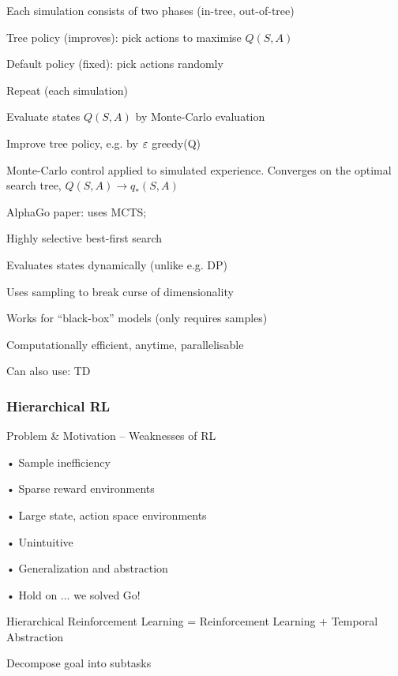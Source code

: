 \documentclass[english]{article}
\begin{document}
Each simulation consists of two phases (in-tree, out-of-tree)
\benum 
\item 
Tree policy (improves): pick actions to maximise $Q(S,A)$
\item 
Default policy (fixed): pick actions randomly
\eenum 
\item 
Repeat (each simulation)
\benum 
\item 
Evaluate states $Q(S,A)$ by Monte-Carlo evaluation
\item 
Improve tree policy, e.g. by $\varepsilon$ greedy(Q)
\eenum 
\item 

Monte-Carlo control applied to simulated experience. Converges on the optimal search tree, $Q(S,A) \to q_*(S,A)$




\item AlphaGo paper: uses MCTS; 

\benum 
\item 
Highly selective best-first search
\item 
Evaluates states dynamically (unlike e.g. DP)
\item 
Uses sampling to break curse of dimensionality
\item 
Works for “black-box” models (only requires samples)
\item 
Computationally efficient, anytime, parallelisable
\eenum 

Can also use: TD

\eenum




\subsubsection{Hierarchical RL}
\benum

\item Problem \& Motivation – Weaknesses of RL

•  Sample inefficiency

• Sparse reward
environments

• Large state, action space
environments

• Unintuitive

• Generalization and
abstraction

• Hold on ... we solved Go!

\item Hierarchical
Reinforcement Learning = 
Reinforcement Learning
+
Temporal
Abstraction

Decompose goal into subtasks
\end{document}
